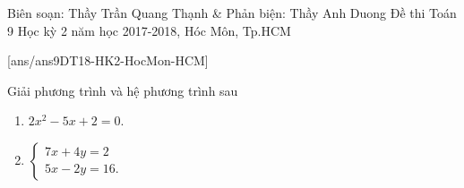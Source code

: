 \begin{name}
{Biên soạn: Thầy Trần Quang Thạnh \& Phản biện: Thầy Anh Duong}
{Đề thi Toán 9 Học kỳ 2 năm học 2017-2018, Hóc Môn, Tp.HCM}
\end{name}
\setcounter{ex}{0}
[ans/ans9DT18-HK2-HocMon-HCM]
\begin{ex}%
	Giải phương trình và hệ phương trình sau
	\begin{enumerate}
		\item $2x^2-5x+2=0$.
		\item $\begin{cases}7x+4y=2\\ 5x-2y=16.\end{cases}$
	\end{enumerate}
\end{ex}


